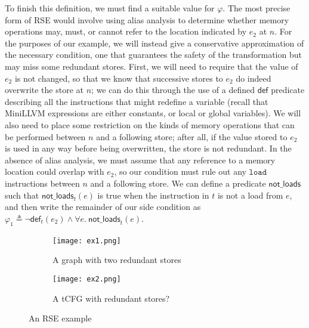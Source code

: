 \documentclass{eptcs}
\begin{document}
To finish this definition, we must find a suitable value for $\varphi$.
The most precise form of RSE would involve using alias analysis to determine whether memory operations may, must, or cannot refer to the location indicated by $e_2$ at $n$. For the purposes of our example, we will instead give a conservative approximation of the necessary condition, one that guarantees the safety of the transformation but may miss some redundant stores. First, we will need to require that the value of $e_2$ is not changed, so that we know that successive stores to $e_2$ do indeed overwrite the store at $n$; we can do this through the use of a defined $\mathsf{def}$ predicate describing all the instructions that might redefine a variable (recall that MiniLLVM expressions are either constants, or local or global variables). 
 We will also need to place some restriction on the kinds of memory operations that can be performed between $n$ and a following store; after all, if the value stored to $e_2$ is used in any way before being overwritten, the store is not redundant. In the absence of alias analysis, we must assume that any reference to a memory location could overlap with $e_2$, so our condition must rule out any $\mathtt{load}$ instructions between $n$ and a following store. We can define a predicate $\mathsf{not\_loads}$ such that $\mathsf{not\_loads}_t(e)$ is true when the instruction in $t$ is not a load from $e$, and then write the remainder of our side condition as $\varphi_1 \triangleq \neg\mathsf{def}_t(e_2) \land \forall e.\ \mathsf{not\_loads}_t(e)$.

\begin{figure}[htb]
\begin{subfigure}[b]{0.35\textwidth}
\centering
\texttt{[image: ex1.png]}\ \ \caption{A graph with two redundant stores}
\label{ex1}
\end{subfigure}
\quad
\begin{subfigure}[b]{0.5\textwidth}
\texttt{[image: ex2.png]}
\caption{A \ac{tCFG} with redundant stores?\qquad}
\label{ex2}
\end{subfigure}
\caption{An RSE example}
\end{figure} 
\end{document}
